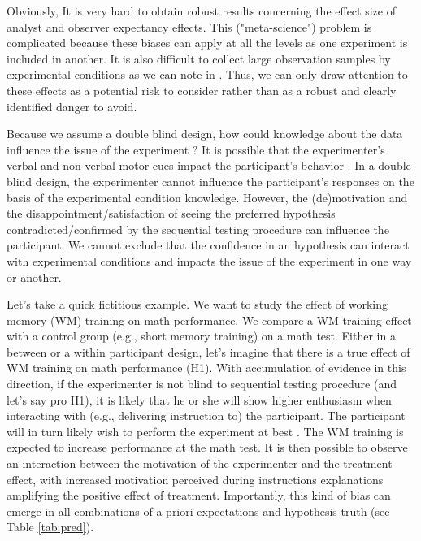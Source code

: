 \documentclass[a4paper,man,natbib,floatsintext,donotrepeattitle]{apa6}
\begin{document}

Obviously, It is very hard to obtain robust results concerning the effect size of analyst and observer expectancy effects. This ("meta-science") problem  is complicated because these biases can apply at all the levels as one experiment is included in another. It is also difficult to collect large observation samples by experimental conditions as we can note  in \cite{zoble_interaction_1969}. Thus, we can only draw attention to these effects as a potential risk to consider rather than as a robust and clearly identified danger to avoid. \par

Because we assume a double blind design, how could knowledge about the data influence the issue of the experiment ? It is possible that the experimenter's verbal and non-verbal motor cues impact the participant's behavior \citep{zoble_interaction_1969}. In a double-blind design, the experimenter cannot influence the participant's responses on the basis of the experimental condition knowledge. However, the (de)motivation and the disappointment/satisfaction of seeing the preferred hypothesis contradicted/confirmed by the sequential testing procedure can influence the participant. We cannot exclude that the confidence in an hypothesis can interact with experimental conditions and impacts the issue of the experiment in one way or another.\par

Let's take a quick fictitious example. We want to study the effect of working memory (WM) training on math performance. We compare a WM training effect with a control group (e.g., short memory training) on a math test. Either in a between or a within participant design, let's imagine that there is a true effect of WM training on math performance (H1). With accumulation of evidence in this direction, if the experimenter is not blind to sequential testing procedure (and let's say pro H1), it is likely that he or she will show higher enthusiasm when interacting with (e.g., delivering instruction to) the participant. The participant will in turn likely wish to perform the experiment at best \citep{zoble_interaction_1969}. The WM training is expected to increase performance at the math test. It is then possible to observe an interaction between the motivation of the experimenter and the treatment effect, with increased motivation perceived during instructions explanations amplifying the positive effect of treatment. Importantly, this kind of bias can emerge in all combinations of a priori expectations and hypothesis truth (see Table \ref{tab:pred}). \par
\end{document}
